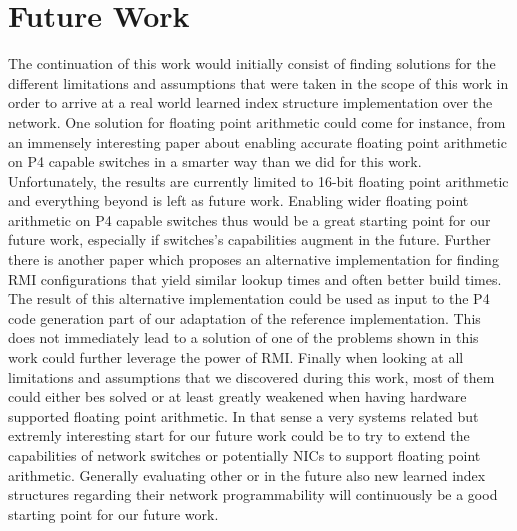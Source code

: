 \section{Future Work}
The continuation of this work would initially consist of finding solutions for the different limitations and assumptions that were taken in the scope of this work in order to arrive at a real world learned index structure implementation over the network. One solution for floating point arithmetic could come for instance, from an immensely interesting paper \cite{netfc} about enabling accurate floating point arithmetic on P4 capable switches in a smarter way than we did for this work. Unfortunately, the results are currently limited to 16-bit floating point arithmetic and everything beyond is left as future work. Enabling wider floating point arithmetic on P4 capable switches thus would be a great starting point for our future work, especially if switches's capabilities augment in the future. Further there is another paper \cite{maltry2021critical} which proposes an alternative implementation for finding RMI configurations that yield similar lookup times and often better build times. The result of this alternative implementation could be used as input to the P4 code generation part of our adaptation of the reference implementation. This does not immediately lead to a solution of one of the problems shown in this work could further leverage the power of RMI. Finally when looking at all limitations and assumptions that we discovered during this work, most of them could either bes solved or at least greatly weakened when having hardware supported floating point arithmetic. In that sense a very systems related but extremly interesting start for our future work could be to try to extend the capabilities of network switches or potentially NICs to support floating point arithmetic. Generally evaluating other or in the future also new learned index structures regarding their network programmability will continuously be a good starting point for our future work.
